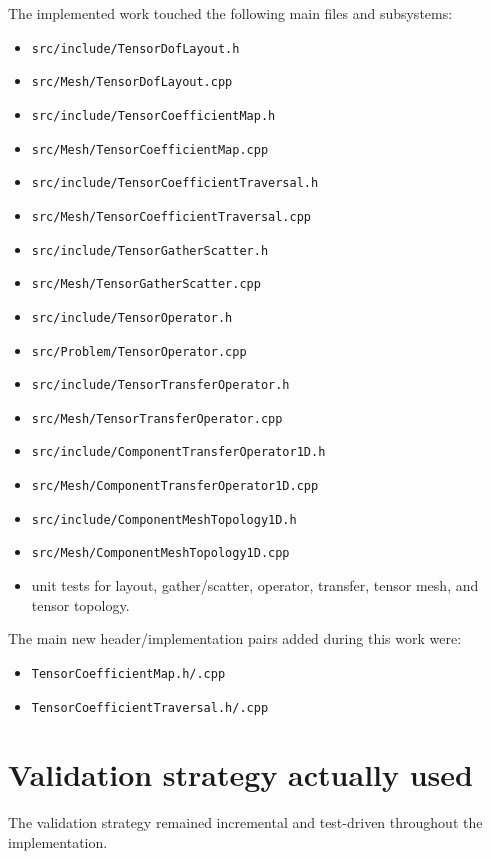 \documentclass[11pt]{article}
\begin{document}
The implemented work touched the following main files and subsystems:

\begin{itemize}[leftmargin=2em]
\item \texttt{src/include/TensorDofLayout.h}
\item \texttt{src/Mesh/TensorDofLayout.cpp}
\item \texttt{src/include/TensorCoefficientMap.h}
\item \texttt{src/Mesh/TensorCoefficientMap.cpp}
\item \texttt{src/include/TensorCoefficientTraversal.h}
\item \texttt{src/Mesh/TensorCoefficientTraversal.cpp}
\item \texttt{src/include/TensorGatherScatter.h}
\item \texttt{src/Mesh/TensorGatherScatter.cpp}
\item \texttt{src/include/TensorOperator.h}
\item \texttt{src/Problem/TensorOperator.cpp}
\item \texttt{src/include/TensorTransferOperator.h}
\item \texttt{src/Mesh/TensorTransferOperator.cpp}
\item \texttt{src/include/ComponentTransferOperator1D.h}
\item \texttt{src/Mesh/ComponentTransferOperator1D.cpp}
\item \texttt{src/include/ComponentMeshTopology1D.h}
\item \texttt{src/Mesh/ComponentMeshTopology1D.cpp}
\item unit tests for layout, gather/scatter, operator, transfer, tensor mesh, and tensor topology.
\end{itemize}

The main new header/implementation pairs added during this work were:
\begin{itemize}[leftmargin=2em]
\item \texttt{TensorCoefficientMap.h/.cpp}
\item \texttt{TensorCoefficientTraversal.h/.cpp}
\end{itemize}

\section{Validation strategy actually used}

The validation strategy remained incremental and test-driven throughout the implementation.
\end{document}
